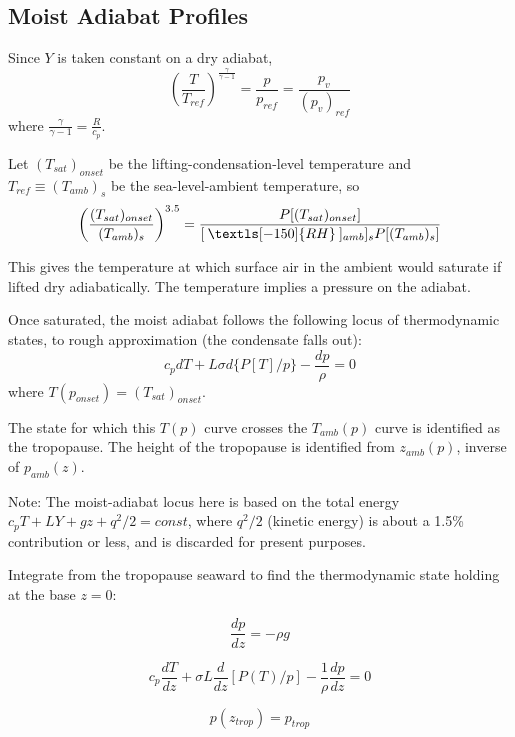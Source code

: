 \documentclass[preprint, prX]{revtex4}
\newcommand{\pfrac}[2]{\left(\frac{#1}{#2}\right)}
\newcommand{\dd}[2]{\frac{d#1}{d#2}}
\newcommand{\gogmo}{\frac{\gamma}{\gamma-1}}
\newcommand{\rh}{\:\textls[-150]{RH}\:}
\newcommand{\ztrop}{z_{trop}}
\begin{document}
\subsection{Moist Adiabat Profiles}

Since $Y$ is taken constant on a dry adiabat,   
\begin{equation}
	 \pfrac{T}{T_{ref}}^\gogmo = \frac{p}{p_{ref}} = \frac{p_v}{(p_v)_{ref}}
\end{equation}
where $\gogmo = \frac{R}{c_p}$.

Let $(T_{sat})_{onset}$ be the lifting-condensation-level temperature and $T_{ref} \equiv (T_{amb})_s$ be the sea-level-ambient temperature, so
\begin{equation}
	 \pfrac{ (T_{sat} )_{onset}  }{ (T_{amb})_s } ^{3.5} = \frac{ P[ (T_{sat})_{onset}]   }{[\rh]_{amb}]_s P[(T_{amb})_s]}
\end{equation}


This gives the temperature at which surface air in the ambient would saturate if lifted dry adiabatically. The temperature implies a pressure on the adiabat.

Once saturated, the moist adiabat follows the following locus of thermodynamic states, to rough approximation (the condensate falls out):
\begin{equation}
	c_p dT + L \sigma d\{ P[T]/p \} - \frac{dp}{\rho} = 0
\end{equation}
where $T(p_{onset} ) = (T_{sat} )_{onset}$.

The state for which this $T(p)$ curve crosses the $T_{amb}(p)$ curve is identified as the tropopause. The height of the tropopause is identified from $z_{amb}(p)$, inverse of $p_{amb}(z)$.

Note: The moist-adiabat locus here is based on the total energy $c_p T + L Y + gz + q^2/2 = const$, where $q^2/2$ (kinetic energy) is about a 1.5\% contribution or less, and is discarded for present purposes.

Integrate from the tropopause seaward to find the thermodynamic state holding at the base $z=0$:

\begin{equation}
	\frac{dp}{dz} = - \rho g
\end{equation}

\begin{equation}
	c_p \dd{T}{z} + \sigma L \dd{}{z} [ P(T) / p] - \frac{1}{\rho} \dd{p}{z} = 0
\end{equation}

\begin{equation}
	p(\ztrop) = p_{trop} 
\end{equation}
\end{document}
